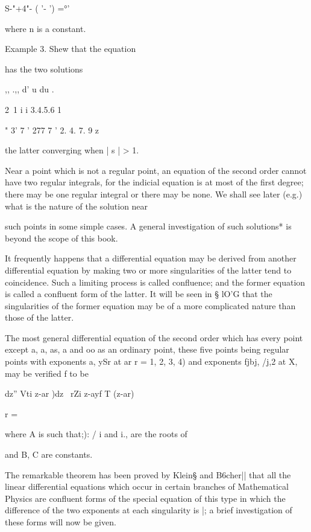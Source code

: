  S-"+4"- ( '- ') =°'

where n is a constant.

Example 3. Shew that the equation

has the two solutions

,, .,, d' u du .

2\ 1 i i 3.4.5.6 1

 " 3' 7 ' 277 7 ' 2. 4. 7. 9 z

the latter converging when | s | > 1.


Near a point which is not a regular point, an equation of the second
order cannot have two regular integrals, for the indicial equation is
at most of the first degree; there may be one regular integral or
there may be none. We shall see later (e.g.) what is the nature
of the solution near

%
%

such points in some simple cases. A general investigation of such
solutions* is beyond the scope of this book.

It frequently happens that a differential equation may be derived from
another differential equation by making two or more singularities of
the latter tend to coincidence. Such a limiting process is called
confluence; and the former equation is called a confluent form of the
latter. It will be seen in § lO'G that the singularities of the former
equation may be of a more complicated nature than those of the latter.


The most general differential equation of the second order which has
every point except a, a, as, a and oo as an ordinary point, these
five points being regular points with exponents a, ySr at ar r = 1,
2, 3, 4) and exponents fjbj, /j,2 at X, may be verified f to be

dz'' Vti z-ar )dz \ rZi z-ayf T (z-ar)

r = \

where A is such that;): / i and i., are the roots of

and B, C are constants.

The remarkable theorem has been proved by Klein§ and B6cher|| that all
the linear differential equations which occur in certain branches of
Mathematical Physics are confluent forms of the special equation of
this type in which the difference of the two exponents at each
singularity is |; a brief investigation of these forms will now be
given.

